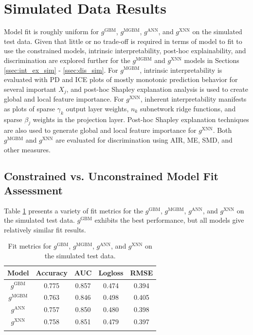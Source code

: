 \documentclass[information,article,submit,moreauthors,pdftex]{definitions/mdpi}
\begin{document}
\section{Simulated Data Results}

Model fit is roughly uniform for $g^\text{GBM}$, $g^\text{MGBM}$, $g^\text{ANN}$, and $g^\text{XNN}$ on the simulated test data. Given that little or no trade-off is required in terms of model to fit to use the constrained models, intrinsic interpretability, post-hoc explainability, and discrimination are explored further for the $g^\text{MGBM}$ and $g^\text{XNN}$ models in Sections \ref{ssec:int_ex_sim} - \ref{ssec:dis_sim}. For $g^\text{MGBM}$, intrinsic interpretability is evaluated with PD and ICE plots of mostly monotonic prediction behavior for several important $X_j$, and post-hoc Shapley explanation analysis is used to create global and local feature importance. For $g^\text{XNN}$, inherent interpretability manifests as plots of sparse $\gamma_k$ output layer weights, $n_k$ subnetwork ridge functions, and sparse $\beta_j$ weights in the projection layer. Post-hoc Shapley explanation techniques are also used to generate global and local feature importance for $g^\text{XNN}$. Both $g^\text{MGBM}$ and $g^\text{XNN}$ are evaluated for discrimination using AIR, ME, SMD, and other measures.

\subsection{Constrained vs. Unconstrained Model Fit Assessment}\label{ssec: c_v_uc_sim}

Table \ref{tab:sim_acc} presents a variety of fit metrics for the $g^\text{GBM}$, $g^\text{MGBM}$, $g^\text{ANN}$, and $g^\text{XNN}$ on the simulated test data. $g^\text{GBM}$ exhibits the best performance, but all models give relatively similar fit results.

\begin{table}[H]
	\caption{Fit metrics for $g^\text{GBM}$, $g^\text{MGBM}$, $g^\text{ANN}$, and $g^\text{XNN}$ on the simulated test data.}
	\centering
	\begin{tabular}{ccccc}
		\toprule
		\textbf{Model}		& \textbf{Accuracy}	& \textbf{AUC}	 & \textbf{Logloss}	& \textbf{RMSE}\\
		\midrule
		$g^\text{GBM}$		& 0.775	& 0.857	& 0.474	& 0.394 \\
		$g^\text{MGBM}$	& 0.763	& 0.846	& 0.498	& 0.405 \\
		$g^\text{ANN}$		& 0.757	& 0.850	& 0.480	& 0.398 \\
		$g^\text{XNN}$		& 0.758	& 0.851	& 0.479	& 0.397 \\
		\bottomrule
		\label{tab:sim_acc}
	\end{tabular}
\end{table}
\end{document}
